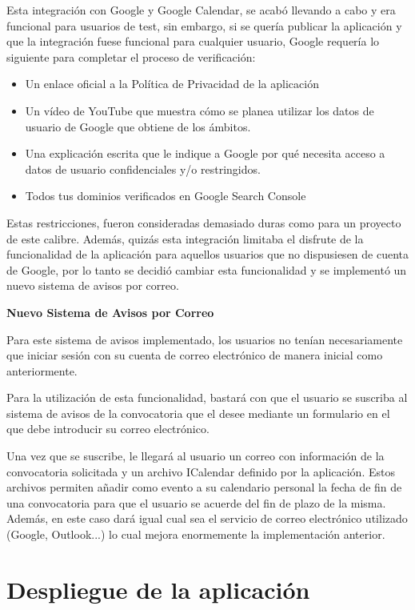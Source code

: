 Esta integración con Google y Google Calendar, se acabó llevando a cabo y era funcional para usuarios de test, sin embargo, si se quería publicar la aplicación y que la integración fuese funcional para cualquier usuario, Google requería lo siguiente para completar el proceso de verificación:

\begin{itemize}
    \item Un enlace oficial a la Política de Privacidad de la aplicación
    \item Un vídeo de YouTube que muestra cómo 
 se planea utilizar los datos de usuario de Google que obtiene de los ámbitos.
    \item Una explicación escrita que le indique a Google por qué necesita acceso a datos de usuario confidenciales y/o restringidos.
    \item Todos tus dominios verificados en Google Search Console
\end{itemize}

Estas restricciones, fueron consideradas demasiado duras como para un proyecto de este calibre. Además, quizás esta integración limitaba el disfrute de la funcionalidad de la aplicación para aquellos usuarios que no dispusiesen de cuenta de Google, por lo tanto se decidió cambiar esta funcionalidad y se implementó un nuevo sistema de avisos por correo.

\textbf{Nuevo Sistema de Avisos por Correo}

Para este sistema de avisos implementado, los usuarios no tenían necesariamente que iniciar sesión con su cuenta de correo electrónico de manera inicial como anteriormente. 

Para la utilización de esta funcionalidad, bastará con que el usuario se suscriba al sistema de avisos de la convocatoria que el desee mediante un formulario en el que debe introducir su correo electrónico. 

Una vez que se suscribe, le llegará al usuario un correo con información de la convocatoria solicitada y un archivo ICalendar definido por la aplicación. Estos archivos permiten añadir como evento a su calendario personal la fecha de fin de una convocatoria para que el usuario se acuerde del fin de plazo de la misma. Además, en este caso dará igual cual sea el servicio de correo electrónico utilizado (Google, Outlook...) lo cual mejora enormemente la implementación anterior.

\section{Despliegue de la aplicación}

